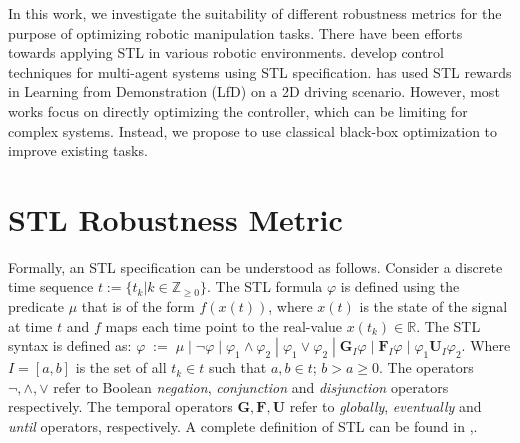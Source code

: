 \documentclass[conference]{IEEEtran}
\begin{document}
In this work, we investigate the suitability of different robustness metrics for the purpose of optimizing robotic manipulation tasks.
There have been efforts towards applying STL in various robotic environments.
\cite{gundana2021event, lindemann2020barrier} develop control techniques for multi-agent systems using STL specification.
\cite{puranic2021learning} has used STL rewards in Learning from Demonstration (LfD) on a 2D driving scenario.
However, most works focus on directly optimizing the controller, which can be limiting for complex systems.
Instead, we propose to use classical black-box optimization to improve existing tasks.

\section{STL Robustness Metric} \label{Sec: RobMetric}
Formally, an STL specification can be understood as follows.
Consider a discrete time sequence $t := \{t_k | k \in \mathbb{Z}_{\geqslant0}\}$.
The STL formula $\varphi$ is defined using the predicate $\mu$ that is of the form $f(x(t))$, where $x(t)$ is the state of the signal at time $t$ and $f$ maps each time point to the real-value $x(t_k)\in \mathbb{R}$.
The STL syntax is defined as:
$
    \varphi \;  := \; \mu \; | \; \neg\varphi \; | \; \varphi_1\land\varphi_2 \; | \; \varphi_1\lor\varphi_2 \; | \; \mathbf{G}_{I}\varphi \; | \; \mathbf{F}_{I}\varphi \; | \; \varphi_1 \mathbf{U}_{I}\varphi_2
$. 
Where $I = [a, b]$ is the set of all $t_k \in t$ such that $a, b \in t$; $b > a \geq 0$.
The operators $\neg, \land, \lor$ refer to Boolean \emph{negation}, \emph{conjunction} and \emph{disjunction} operators respectively.
The temporal operators $\mathbf{G}, \textbf{F}, \mathbf{U}$ refer to \emph{globally}, \emph{eventually} and \emph{until} operators, respectively.
A complete definition of STL can be found in \cite{aksaray2016q},\cite{mehdipour2019arithmetic}. 
\end{document}
